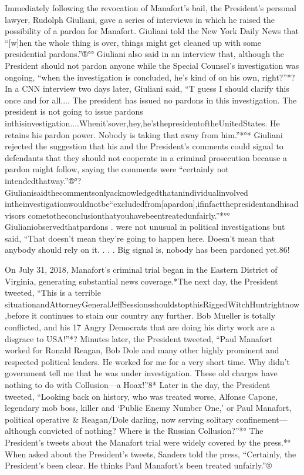 Immediately following the revocation of Manafort's bail, the President's personal lawyer, Rudolph Giuliani, gave a series of interviews in which he raised the possibility of a pardon for Manafort. Giuliani told the New York Daily News that “[w]hen the whole thing is over, things might get cleaned up with some presidential pardons.”®°° Giuliani also said in an interview that, although the President should not pardon anyone while the Special Counsel's investigation was ongoing, “when the investigation is concluded, he's kind of on his own, right?”*? In a CNN interview two days later, Giuliani said, “T guess I should clarify this once and for all.... The president has issued no pardons in this investigation. The president is not going to issue pardons inthisinvestigation....Whenit'sover,hey,he'sthepresidentoftheUnitedStates. He retains his pardon power. Nobody is taking that away from him.”*°* Giuliani rejected the suggestion that his and the President's comments could signal to defendants that they should not cooperate in a criminal prosecution because a pardon might follow, saying the comments were “certainly not intendedthatway.”®°? Giulianisaidthecommentsonlyacknowledgedthatanindividualinvolved intheinvestigationwouldnotbe“excludedfrom[apardon],ifinfactthepresidentandhisadvisors
cometotheconclusionthatyouhavebeentreatedunfairly.”*°° Giulianiobservedthatpardons
.
were not unusual in political investigations but said, “That doesn't mean they're going to happen here. Doesn't mean that anybody should rely on it. . . . Big signal is, nobody has been pardoned yet.86!

On July 31, 2018, Manafort's criminal trial began in the Eastern District of Virginia, generating substantial news coverage.*The next day, the President tweeted, “This is a terrible situationandAttorneyGeneralJeffSessionsshouldstopthisRiggedWitchHuntrightnow,before it continues to stain our country any further. Bob Mueller is totally conflicted, and his 17 Angry Democrats that are doing his dirty work are a disgrace to USA!”*? Minutes later, the President tweeted, “Paul Manafort worked for Ronald Reagan, Bob Dole and many other highly prominent and respected political leaders. He worked for me for a very short time. Why didn't government tell me that he was under investigation. These old charges have nothing to do with Collusion—a Hoax!”8* Later in the day, the President tweeted, “Looking back on history, who was treated worse, Alfonse Capone, legendary mob boss, killer and ‘Public Enemy Number One,' or Paul Manafort, political operative & Reagan/Dole darling, now serving solitary confinement—although convicted of nothing? Where is the Russian Collusion?”*° The President's tweets about the Manafort trial were widely covered by the press.*° When asked about the President's tweets, Sanders told the press, “Certainly, the President's been clear. He thinks Paul Manafort's been treated unfairly.”®%

